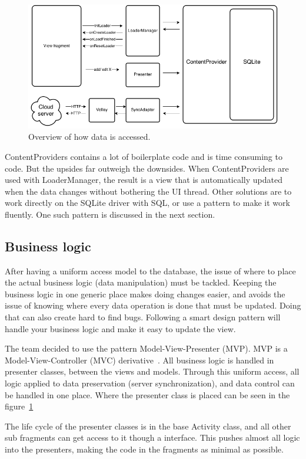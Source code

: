 \begin{figure}[H]
\includegraphics[width=\textwidth]{ch/architecture/fig/arch_app_overview.png}
\caption{Overview of how data is accessed.}
\label{fig:arch_app_overview}
\end{figure}

ContentProviders contains a lot of boilerplate code and is time consuming to code. But the upsides far outweigh the downsides. When ContentProviders are used with LoaderManager, the result is a view that is automatically updated when the data changes without bothering the UI thread. Other solutions are to work directly on the SQLite driver with SQL, or use a pattern to make it work fluently. One such pattern is discussed in the next section. 

\subsection{Business logic}
After having a uniform access model to the database, the issue of where to place the actual business logic (data manipulation) must be tackled. Keeping the business logic in one generic place makes doing changes easier, and avoids the issue of knowing where every data operation is done that must be updated. Doing that can also create hard to find bugs. Following a smart design pattern will handle your business logic and make it easy to update the view. 

The team decided to use the pattern Model-View-Presenter (MVP). MVP is a Model-View-Controller (MVC) derivative~\cite{mvc}. All business logic is handled in presenter classes, between the views and models. Through this uniform access, all logic applied to data preservation (server synchronization), and data control can be handled in one place. Where the presenter class is placed can be seen in the figure~\ref{fig:arch_app_overview}

The life cycle of the presenter classes is in the base Activity class, and all other sub fragments can get access to it though a interface. 
This pushes almost all logic into the presenters, making the code in the fragments as minimal as possible. 

